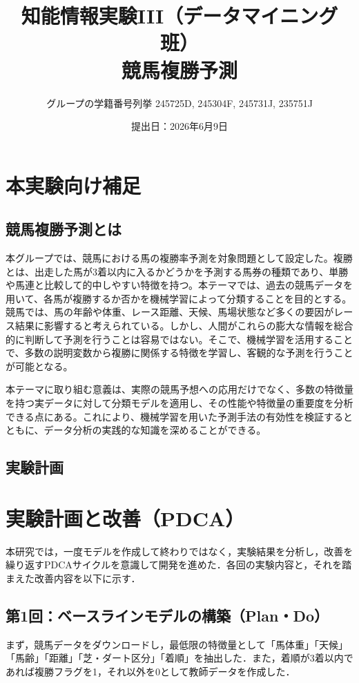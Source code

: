 \documentclass[dvipdfmx, a4paper, 11pt, titlepage]{jsarticle}
\title{知能情報実験III（データマイニング班）\\競馬複勝予測}
\author{グループの学籍番号列挙 245725D, 245304F, 245731J, 235751J}
\date{提出日：2026年6月9日}
\begin{document}
\maketitle
\tableofcontents
\clearpage


\section{本実験向け補足}

\subsection{競馬複勝予測とは}
本グループでは、競馬における馬の複勝率予測を対象問題として設定した。複勝とは、出走した馬が3着以内に入るかどうかを予測する馬券の種類であり、単勝や馬連と比較して的中しやすい特徴を持つ。本テーマでは、過去の競馬データを用いて、各馬が複勝するか否かを機械学習によって分類することを目的とする。
競馬では、馬の年齢や体重、レース距離、天候、馬場状態など多くの要因がレース結果に影響すると考えられている。しかし、人間がこれらの膨大な情報を総合的に判断して予測を行うことは容易ではない。そこで、機械学習を活用することで、多数の説明変数から複勝に関係する特徴を学習し、客観的な予測を行うことが可能となる。

本テーマに取り組む意義は、実際の競馬予想への応用だけでなく、多数の特徴量を持つ実データに対して分類モデルを適用し、その性能や特徴量の重要度を分析できる点にある。これにより、機械学習を用いた予測手法の有効性を検証するとともに、データ分析の実践的な知識を深めることができる。

\subsection{実験計画}
\section{実験計画と改善（PDCA）}

本研究では，一度モデルを作成して終わりではなく，実験結果を分析し，改善を繰り返すPDCAサイクルを意識して開発を進めた．各回の実験内容と，それを踏まえた改善内容を以下に示す．

\subsection{第1回：ベースラインモデルの構築（Plan・Do）}

まず，競馬データをダウンロードし，最低限の特徴量として「馬体重」「天候」「馬齢」「距離」「芝・ダート区分」「着順」を抽出した．また，着順が3着以内であれば複勝フラグを1，それ以外を0として教師データを作成した．
\end{document}
